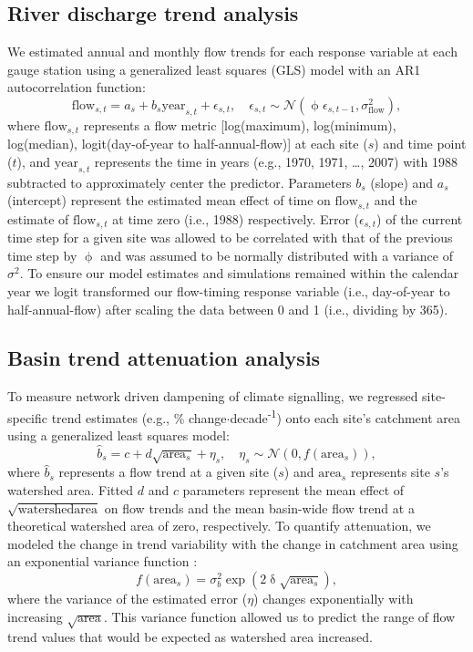 \documentclass[9pt,twocolumn,twoside,lineno]{pnas-new}
\begin{document}
{\subsection*{River discharge trend analysis} We estimated annual and monthly flow trends for each response variable at each gauge station using a generalized least squares (GLS) model with an AR1 autocorrelation function:
\begin{equation}
  \mathrm{flow}_{s,t} = a_s + b_s \mathrm{year}_{s,t} + \epsilon_{s,t}, \quad 
  \epsilon_{s,t} \sim \mathcal{N}(\upphi \epsilon_{s,t-1}, \sigma_\mathrm{flow}^2) \label{eq1},
\end{equation}
where $\mathrm{flow}_{s,t}$ represents a flow metric [log(maximum), log(minimum), log(median), logit(day-of-year to half-annual-flow)] at each site ($s$) and time point ($t$),  and $\mathrm{year}_{s,t}$ represents the time in years (e.g., 1970, 1971, \ldots, 2007) with 1988 subtracted to approximately center the predictor. Parameters $b_{s}$ (slope) and $a_{s}$ (intercept) represent the estimated mean effect of time on $\mathrm{flow}_{s,t}$ and the estimate of $\mathrm{flow}_{s,t}$ at time zero (i.e., 1988) respectively. Error ($\epsilon_{s,t}$) of the current time step for a given site was allowed to be correlated with that of the previous time step by $\upphi$ and was assumed to be normally distributed with a variance of $\sigma^{2}$. To ensure our model estimates and simulations remained within the calendar year we logit transformed our flow-timing response variable (i.e., day-of-year to half-annual-flow) after scaling the data between 0 and 1 (i.e., dividing by 365).

\subsection*{Basin trend attenuation analysis} To measure network driven dampening of climate signalling, we regressed site-specific trend estimates (e.g., \% change$\cdot$decade\textsuperscript{-1}) onto each site's catchment area using a generalized least squares model:
\begin{equation}
	\hat{b}_{s} = c + d\sqrt{\mathrm{area}_{s}} + \eta_{s}, \quad
  \eta_{s} \sim \mathcal{N}(0, f(\mathrm{area}_{s})) \label{eq2},
\end{equation}
where $\hat{b}_{s}$ represents a flow trend at a given site ($s$) and $\mathrm{area}_{s}$ represents site $s$'s watershed area. Fitted $d$ and $c$ parameters represent the mean effect of $\sqrt{\mathrm{watershed area}}$ on flow trends and the mean basin-wide flow trend at a theoretical watershed area of zero, respectively. To quantify attenuation, we modeled the change in trend variability with the change in catchment area using an exponential variance function \cite[p.~211]{Pinheiro:2000}: 
\begin{equation}
	f(\mathrm{area}_{s}) = \sigma_b^2 \exp(2\updelta\sqrt{\mathrm{area}_{s}}) \label{eq3},
\end{equation}
where the variance of the estimated error ($\eta$) changes exponentially with increasing $\sqrt{\mathrm{area}}$. This variance function allowed us to predict the range of flow trend values that would be expected as watershed area increased. 

}
\end{document}
